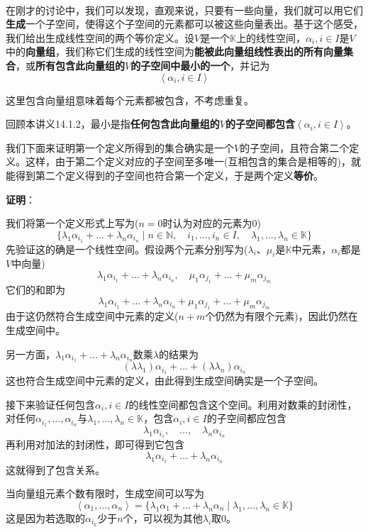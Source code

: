 \documentclass[a4paper,UTF8,fontset=windows,AutoFakeBold]{ctexart}
\newcommand*{\note}{\noindent *}
\newcommand{\proo}[1]{{\vspace{5pt}\kaishu\noindent\textbf{证明}：\vspace{-3pt}
\begin{compactitem}
    \item[] #1
\end{compactitem}
}}
\begin{document}
\

在刚才的讨论中，我们可以发现，直观来说，只要有一些向量，我们就可以用它们\textbf{生成}一个子空间，使得这个子空间的元素都可以被这些向量表出。基于这个感受，我们给出生成线性空间的两个等价定义。设$V$是一个$\mathbb{K}$上的线性空间，$\alpha_i,i\in I$是$V$中的\textbf{向量组}，我们称它们生成的线性空间为\textbf{能被此向量组线性表出的所有向量集合}，或\textbf{所有包含此向量组的$V$的子空间中最小的一个}，并记为
$$\left<\alpha_i,i\in I\right>$$

\note 这里包含向量组意味着每个元素都被包含，不考虑重复。

\note 回顾本讲义14.1.2，最小是指\textbf{任何包含此向量组的$V$的子空间都包含$\left<\alpha_i,i\in I\right>$}。

我们下面来证明第一个定义所得到的集合确实是一个$V$的子空间，且符合第二个定义。这样，由于第二个定义对应的子空间至多唯一(互相包含的集合是相等的)，就能得到第二个定义得到的子空间也符合第一个定义，于是两个定义\textbf{等价}。

\proo{
    我们将第一个定义形式上写为($n=0$时认为对应的元素为0)
    $$\big\{\lambda_1\alpha_{i_1}+\dots+\lambda_n\alpha_{i_n}\mid n\in\mathbb{N},\quad i_1,\dots,i_n\in I,\quad\lambda_1,\dots,\lambda_n\in\mathbb{K}\big\}$$
    先验证这的确是一个线性空间。假设两个元素分别写为($\lambda_i$、$\mu_i$是$\mathbb{K}$中元素，$\alpha_i$都是$V$中向量)
    $$\lambda_1\alpha_{i_1}+\dots+\lambda_n\alpha_{i_n},\quad \mu_1\alpha_{j_1}+\dots+\mu_m\alpha_{j_m}$$
    它们的和即为
    $$\lambda_1\alpha_{i_1}+\dots+\lambda_n\alpha_{i_n}+\mu_1\alpha_{j_1}+\dots+\mu_m\alpha_{j_m}$$
    由于这仍然符合生成空间中元素的定义($n+m$个仍然为有限个元素)，因此仍然在生成空间中。

    另一方面，$\lambda_1\alpha_{i_1}+\dots+\lambda_n\alpha_{i_n}$数乘$\lambda$的结果为
    $$(\lambda\lambda_1)\alpha_{i_1}+\dots+(\lambda\lambda_n)\alpha_{i_n}$$
    这也符合生成空间中元素的定义，由此得到生成空间确实是一个子空间。

    接下来验证任何包含$\alpha_i,i\in I$的线性空间都包含这个空间。利用对数乘的封闭性，对任何$\alpha_{i_1},\dots,\alpha_{i_n}$与$\lambda_1,\dots,\lambda_n\in\mathbb{K}$，包含$\alpha_i,i\in I$的子空间都应包含
    $$\lambda_1\alpha_{i_1},\quad\dots,\quad\lambda_n\alpha_{i_n}$$
    再利用对加法的封闭性，即可得到它包含
    $$\lambda_1\alpha_{i_1}+\dots+\lambda_n\alpha_{i_n}$$
    这就得到了包含关系。
}

\note 当向量组元素个数有限时，生成空间可以写为
$$\left<\alpha_1,\dots,\alpha_n\right>=\big\{\lambda_1\alpha_1+\dots+\lambda_n\alpha_n\mid \lambda_1,\dots,\lambda_n\in\mathbb{K}\big\}$$
这是因为若选取的$\alpha_{i_k}$少于$n$个，可以视为其他$\lambda_i$取0。
\end{document}

